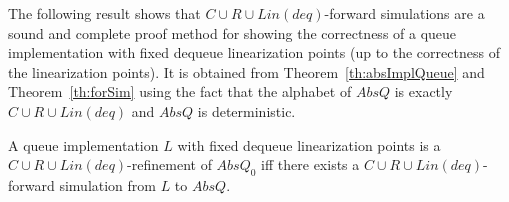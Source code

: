 
The following result shows that $C\cup R\cup Lin(deq)$-forward simulations are a sound and complete proof method for showing the correctness of a queue implementation with fixed dequeue linearization points (up to the correctness of the linearization points). It is obtained from Theorem~\ref{th:absImplQueue} and Theorem~\ref{th:forSim} using the fact that the alphabet of $AbsQ$ is exactly $C\cup R\cup Lin(deq)$ and $AbsQ$ is deterministic.

\vspace{-1.5mm}
\begin{corollary}
A queue implementation $L$ with fixed dequeue linearization points is a $C\cup R\cup Lin(deq)$-refinement of $AbsQ_0$ if{f} there exists a $C\cup R\cup Lin(deq)$-forward simulation from $L$ to $AbsQ$.
\vspace{-1.5mm}
\end{corollary}

\vspace{-4.5mm}

